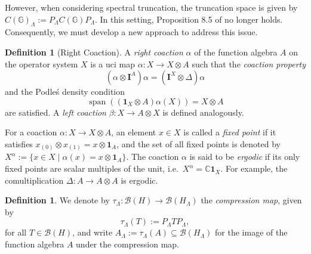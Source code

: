 \documentclass[12pt, reqno]{amsart}
\theoremstyle{definition}
\newtheorem{definition}[theorem]{Definition}
\theoremstyle{remark}
\numberwithin{equation}{section}
\begin{document}
However, when considering spectral truncation, the truncation space is given by 
$C(\mathbb{G})_\Lambda := P_\Lambda C(\mathbb{G}) P_\Lambda$. 
In this setting, Proposition 8.5 of \cite{9} no longer holds. 
Consequently, we must  develop a new approach to address this issue.
\begin{definition}[Right Coaction]
A \emph{right coaction} $\alpha$ of the function algebra $A$ on the operator system $X$ is a uci map $\alpha: X \to X \otimes A$ such that the \emph{coaction property}
\begin{equation}\label{eq:coaction-prop}
(\alpha \otimes \mathbf{I}^A)\alpha = (\mathbf{I}^X \otimes \Delta)\alpha
\end{equation}
and the Podle\'s density condition
\[
\operatorname{span}((\mathbf{1}_X \otimes A)\alpha(X)) = X \otimes A
\]
are satisfied. A \emph{left coaction} $\beta: X \to A \otimes X$ is defined analogously.
\end{definition}

For a coaction \(\alpha\colon X\to X\otimes A\), an element \(x\in X\) is called a 
\emph{fixed point} if it satisfies \(x_{(0)}\otimes x_{(1)} = x\otimes \mathbf{1}_A\), 
and the set of all fixed points is denoted by 
\(X^\alpha := \{x\in X \mid \alpha(x)=x\otimes \mathbf{1}_A\}\). 
The coaction \(\alpha\) is said to be \emph{ergodic} if its only fixed points are 
scalar multiples of the unit, i.e.\ \(X^\alpha = \mathbb{C}\mathbf{1}_X\). 
For example, the comultiplication \(\Delta\colon A\to A\otimes A\) is ergodic.

\begin{definition}
We denote by $\tau_{\Lambda}: \mathcal{B}(H) \to \mathcal{B}(H_{\Lambda})$ the \emph{compression map}, given by
\[
\tau_{\Lambda}(T) := P_{\Lambda} T P_{\Lambda},
\]
for all $T \in \mathcal{B}(H)$, and write $A_{\Lambda} := \tau_{\Lambda}(A) \subseteq \mathcal{B}(H_{\Lambda})$ for the image of the function algebra $A$ under the compression map.
\end{definition}
\end{document}
